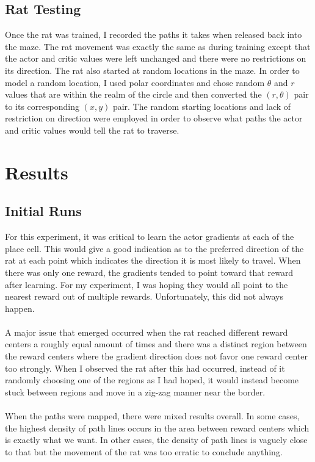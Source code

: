 \documentclass[conference]{IEEEtran}
\begin{document}
\subsection{Rat Testing}

Once the rat was trained, I recorded the paths it takes when released back into the maze. The rat movement was exactly the same as during training except that the actor and critic values were left unchanged and there were no restrictions on its direction. The rat also started at random locations in the maze. In order to model a random location, I used polar coordinates and chose random $\theta$ and $r$ values that are within the realm of the circle and then converted the $(r,\theta)$ pair to its corresponding $(x,y)$ pair. The random starting locations and lack of restriction on direction were employed in order to observe what paths the actor and critic values would tell the rat to traverse. 

\section{Results}

\subsection{Initial Runs}

For this experiment, it was critical to learn the actor gradients at each of the place cell. This would give a good indication as to the preferred direction of the rat at each point which indicates the direction it is most likely to travel. When there was only one reward, the gradients tended to point toward that reward after learning. For my experiment, I was hoping they would all point to the nearest reward out of multiple rewards. Unfortunately, this did not always happen. \\
\\
A major issue that emerged occurred when the rat reached different reward centers a roughly equal amount of times and there was a distinct region between the reward centers where the gradient direction does not favor one reward center too strongly. When I observed the rat after this had occurred, instead of it randomly choosing one of the regions as I had hoped, it would instead become stuck between regions and move in a zig-zag manner near the border.\\
\\
When the paths were mapped, there were mixed results overall. In some cases, the highest density of path lines occurs in the area between reward centers which is exactly what we want. In other cases, the density of path lines is vaguely close to that but the movement of the rat was too erratic to conclude anything. 
\end{document}
